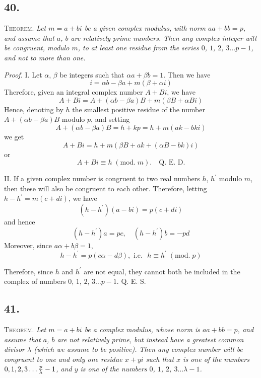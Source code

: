\documentclass[twoside,12pt]{memoir}
\renewcommand{\pmod}[1]{\;(\textrm{mod.}\;#1)}
\let\oldfrac\frac
\def\frac#1#2{\mathchoice{\tfrac{#1}{#2}}{\oldfrac{#1}{#2}}{\genfrac{}{}{}{2}{#1}{#2\mathstrut}}{\genfrac{}{}{}{3}{#1}{#2\mathstrut}}}
\begin{document}
\subsection*{40.}
 
\textsc{Theorem.} \textit{Let \(m=a+b i\) be a given complex modulus, with norm \(a a+b b=p\), and assume that \(a\), \(b\) are relatively prime numbers.  Then any complex integer will be congruent, modulo \(m\), to at least one residue from the series \(0\), \(1\), \(2\), \(3 \ldots p-1\), and not to more than one.}
 
\textit{Proof.} I. Let \(\alpha\), \(\beta\) be integers such that \(\alpha a+\beta b=1\). Then we have
\[i=\alpha b-\beta a+m(\beta+\alpha i)\]
Therefore, given an integral complex number \(A+B i\), we have
\[A+B i=A+(\alpha b-\beta a) B+m(\beta B+\alpha B i)\]
Hence, denoting by \(h\) the smallest positive residue of the number \(A+(\alpha b-\beta a) B\) modulo \(p\), and setting
\[A+(\alpha b-\beta a) B=h+k p=h+m(a k-b k i)\]
we get
\[A+B i=h+m(\beta B+a k+(\alpha B-b k) i)\]
or
\[A+B i \equiv h\pmod{m} . \quad \text{Q. E. D.}\]
 
II. If a given complex number is congruent to two real numbers \(h\), \(h^{\prime}\) modulo \(m\), then these will also be congruent to each other. Therefore, letting \(h-h^{\prime}=m(c+d i)\), we have
\[(h-h^{\prime})(a-b i)=p(c+d i)\]
and hence
\[(h-h^{\prime}) a=p c, \quad (h-h^{\prime}) b=-p d\]
Moreover, since \(a \alpha+b \beta=1\),
\[h-h^{\prime}=p(c \alpha-d \beta), \text{ i{.}e{.} } h \equiv h^{\prime}\pmod{p}\]
 
Therefore, since \(h\) and \(h^{\prime}\) are not equal, they cannot both be included in the complex of numbers \(0\), \(1\), \(2\), \(3 \ldots p-1\). Q. E. S.
%

\subsection*{41.}

\textsc{Theorem.} \textit{Let \(m=a+b i\) be a complex modulus, whose norm is \(a a+b b=p\), and assume that \(a\), \(b\) are not relatively prime, but instead have a greatest common divisor \(\lambda\) (which we assume to be positive).  Then any complex number will be congruent to one and only one residue \(x+y i\) such that \(x\) is one of the numbers \(0,1,2,3 \ldots \frac{p}{\lambda}-1\), and \(y\) is one of the numbers \(0\), \(1\), \(2\), \(3 \ldots \lambda-1\).}
\end{document}
